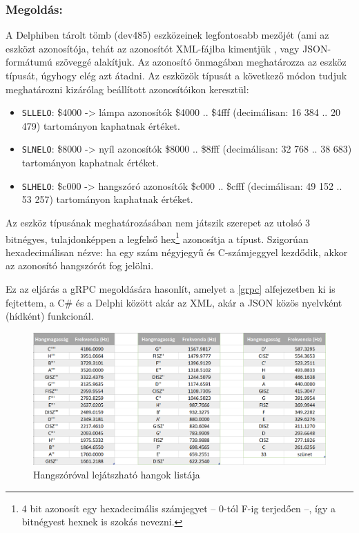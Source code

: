 \documentclass[tocnopagenum]{thesis-ekf}
\theoremstyle{definition}
\theoremstyle{remark}
\begin{document}
	\subsubsection{Megoldás:}
	A Delphiben tárolt tömb (dev485) eszközeinek legfontosabb mezőjét (ami az eszközt azonosítója, tehát az azonosítót XML-fájlba kimentjük \cite{sof_xmlcreate}, vagy JSON-formátumú szöveggé alakítjuk. Az azonosító önmagában meghatározza az eszköz típusát, úgyhogy elég azt átadni.
	Az eszközök típusát a következő módon tudjuk meghatározni kizárólag beállított azonosítóikon keresztül:
	\begin{itemize}
		\item \verb*|SLLELO|: \$4000 -> lámpa azonosítók \$4000 .. \$4fff (decimálisan: 16 384 .. 20 479) tartományon kaphatnak értéket.
		\item \verb*|SLNELO|: \$8000 -> nyíl azonosítók \$8000 .. \$8fff (decimálisan: 32 768 .. 38 683) tartományon kaphatnak értéket.
		\item \verb*|SLHELO|: \$c000 -> hangszóró azonosítók \$c000 .. \$cfff (decimálisan: 49 152 .. 53 257) tartományon kaphatnak értéket.
	\end{itemize}

	Az eszköz típusának meghatározásában nem játszik szerepet az utolsó 3 bitnégyes, tulajdonképpen a legfelső hex\footnote{4 bit azonosít egy hexadecimális számjegyet -- 0-tól F-ig terjedően --, így a bitnégyest hexnek is szokás nevezni.} azonosítja a típust.
	Szigorúan hexadecimálisan nézve: ha egy szám négyjegyű és C-számjeggyel kezdődik, akkor az azonosító hangszórót fog jelölni.

	Ez az eljárás a gRPC megoldására hasonlít, amelyet a  \ref{grpc} alfejezetben ki is fejtettem, a C\# és a Delphi között akár az XML, akár a JSON közös nyelvként (hídként) funkcionál.

	\begin{figure}[h!]
		\centering
		\includegraphics[scale=0.7]{frequencies}
		\caption{Hangszóróval lejátszható hangok listája}
		\label{fig:frequencies}
	\end{figure}
\end{document}
